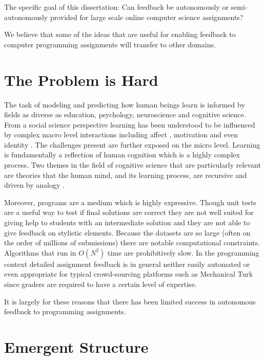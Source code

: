 \begin{mdframed}
The specific goal of this dissertation: Can feedback be autonomously or semi-autonomously provided for large scale online computer science assignments?
\end{mdframed}

We believe that some of the ideas that are useful for enabling feedback to computer programming assignments will transfer to other domains.	

\section{The Problem is Hard}

The task of modeling and predicting how human beings learn is informed by fields as diverse
as education, psychology, neuroscience and cognitive science. From a social science perspective
learning has been understood to be influenced by complex macro level interactions including affect \cite{linnenbrink2004role}
, motivation \cite{elliot2013handbook} and even identity \cite{cohen2008identity}. The challenges present are further exposed on the micro
level. Learning is fundamentally a reflection of human cognition which is a highly complex process.
Two themes in the field of cognitive science that are particularly relevant are theories that the human
mind, and its learning process, are recursive \cite{fitch2005evolution} and driven by analogy \cite{gentner1983structure}.

Moreover, programs are a medium which is highly expressive. Though unit tests are a useful way to test if final solutions are correct they are not well suited for giving help to students with an intermediate solution and they are not able to give feedback on stylistic elements. Because the datasets are so large (often on the order of millions of submissions) there are notable computational constraints. Algorithms that run in $O(N^2)$ time are prohibitively slow. In the programming context detailed assignment feedback is in general neither easily automated or even appropriate for typical crowd-sourcing platforms such as Mechanical Turk since graders are required to have a certain level of expertise. 

It is largely for these reasons that there has been limited success in autonomous feedback to programming assignments.

\section{Emergent Structure}

